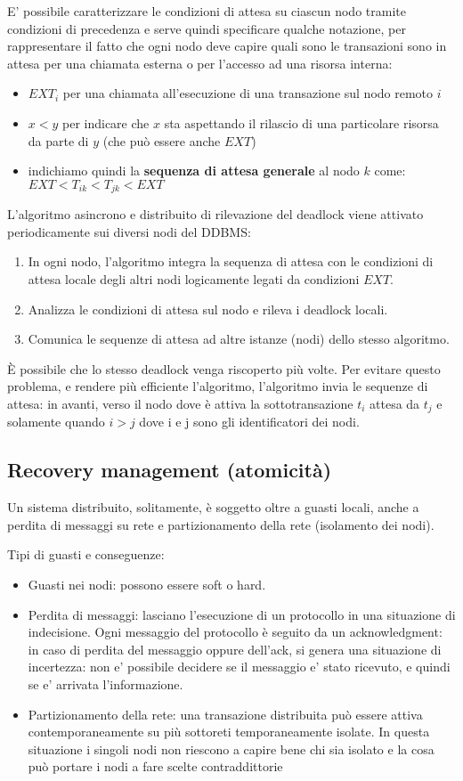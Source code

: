 E’ possibile caratterizzare le condizioni di attesa su ciascun nodo tramite condizioni di precedenza e serve quindi specificare qualche notazione, per rappresentare il fatto che ogni nodo deve capire quali sono le transazioni sono in attesa per una chiamata esterna o per l'accesso ad una risorsa interna: 
\begin{itemize} 
    \item $EXT_i$ per una chiamata all'esecuzione di una transazione sul nodo remoto $i$ 
    \item $x < y$ per indicare che $x$ sta aspettando il rilascio di una particolare risorsa da parte di $y$ (che può essere anche $EXT$) 
    \item indichiamo quindi la \textbf{sequenza di attesa generale} al nodo $k$ come: $EXT < T_{ik} < T_{jk} < EXT$
\end{itemize}
L’algoritmo asincrono e distribuito di rilevazione del deadlock viene attivato periodicamente sui diversi nodi del DDBMS: \begin{enumerate}
    \item In ogni nodo, l’algoritmo integra la sequenza di attesa con le condizioni di attesa locale degli altri nodi logicamente legati da condizioni $EXT$.
    \item Analizza le condizioni di attesa sul nodo e rileva i deadlock locali.
    \item Comunica le sequenze di attesa ad altre istanze (nodi) dello stesso algoritmo.
\end{enumerate}
È possibile che lo stesso deadlock venga riscoperto più volte. Per evitare questo problema, e rendere più efficiente l’algoritmo, l’algoritmo invia le sequenze di attesa: in avanti, verso il nodo dove è attiva la sottotransazione $t_i$ attesa da $t_j$ e solamente quando $ i > j$ dove i e j sono gli identificatori dei nodi.

\subsection{Recovery management (atomicità)}
Un sistema distribuito, solitamente, è soggetto oltre a guasti locali, anche a perdita di messaggi su rete e partizionamento della rete (isolamento dei nodi). 

Tipi di guasti e conseguenze:
\begin{itemize}
    \item Guasti nei nodi: possono essere soft o hard.
    \item Perdita di messaggi: lasciano l’esecuzione di un protocollo in una situazione di indecisione. Ogni messaggio del protocollo è seguito da un acknowledgment: in caso di perdita del messaggio oppure dell’ack, si genera una situazione di incertezza: non e’ possibile decidere se il messaggio e’ stato ricevuto, e quindi se e’ arrivata l’informazione.
    \item Partizionamento della rete: una transazione distribuita può essere attiva contemporaneamente su più sottoreti temporaneamente isolate. In questa situazione i singoli nodi non riescono a capire bene chi sia isolato e la cosa può portare i nodi a fare scelte contraddittorie
\end{itemize}

